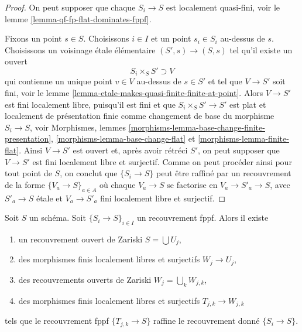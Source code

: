 \begin{proof}
On peut supposer que chaque $S_i \to S$ est localement quasi-fini, voir le
lemme \ref{lemma-qf-fp-flat-dominates-fppf}.

\medskip\noindent
Fixons un point $s \in S$. Choisissons $i \in I$ et un point
$s_i \in S_i$ au-dessus de $s$. Choisissons un voisinage \'etale élémentaire
$(S', s) \to (S, s)$ tel qu'il existe un ouvert
$$
S_i \times_S S'  \supset V
$$
qui contienne un unique point $v \in V$ au-dessus de $s \in S'$
et tel que $V \to S'$ soit fini, voir le
lemme \ref{lemma-etale-makes-quasi-finite-finite-at-point}.
Alors $V \to S'$ est fini localement libre, puisqu'il est fini
et que $S_i \times_S S' \to S'$ est plat et localement de présentation finie
comme changement de base du morphisme $S_i \to S$, voir
Morphismes, lemmes \ref{morphisms-lemma-base-change-finite-presentation},
\ref{morphisms-lemma-base-change-flat} et
\ref{morphisms-lemma-finite-flat}.
Ainsi $V \to S'$ est ouvert et, après avoir rétréci $S'$,
on peut supposer que $V \to S'$ est fini localement libre et surjectif.
Comme on peut procéder ainsi pour tout point de $S$, on conclut que
$\{S_i \to S\}$ peut être raffiné par un recouvrement de la forme
$\{V_a \to S\}_{a \in A}$ où chaque $V_a \to S$ se factorise en
$V_a \to S'_a \to S$, avec $S'_a \to S$ \'etale et $V_a \to S'_a$ fini
localement libre et surjectif.
\end{proof}

\begin{lemma}
\label{lemma-dominate-fppf}
Soit $S$ un schéma. Soit $\{S_i \to S\}_{i \in I}$ un recouvrement fppf.
Alors il existe
\begin{enumerate}
\item un recouvrement ouvert de Zariski $S = \bigcup U_j$,
\item des morphismes finis localement libres et surjectifs $W_j \to U_j$,
\item des recouvrements ouverts de Zariski $W_j = \bigcup_k W_{j, k}$,
\item des morphismes finis localement libres et surjectifs $T_{j, k} \to W_{j, k}$
\end{enumerate}
tels que le recouvrement fppf $\{T_{j, k} \to S\}$ raffine le
recouvrement donné $\{S_i \to S\}$.
\end{lemma}

